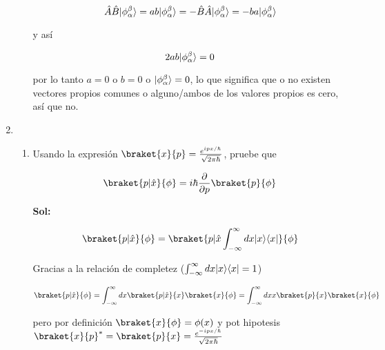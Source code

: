\documentclass[12pt,a4paper]{article}
\DeclarePairedDelimiter\bra{\langle}{\rvert}
\DeclarePairedDelimiter\ket{\lvert}{\rangle}
\begin{document}
\begin{enumerate}
\begin{enumerate}
    \begin{equation*}
        \hat{A}\hat{B} \ket{\phi_{\alpha}^{\beta}} = ab \ket{\phi_{\alpha}^{\beta}} = - \hat{B} \hat{A} \ket{\phi_{\alpha}^{\beta}} = -ba \ket{\phi_{\alpha}^{\beta}}
    \end{equation*}
    
    y así
    
    \begin{equation*}
        2 a b \ket{\phi_{\alpha}^{\beta}} = 0
    \end{equation*}
    
    por lo tanto $a = 0$ o $b =0$ o $\ket{\phi_{\alpha}^{\beta}} = 0$, lo que significa que o no existen vectores propios comunes o  alguno/ambos de los valores propios es cero, así que no.
    
    
    
    
\end{enumerate}






\item \begin{enumerate}
    \item Usando la expresión $\braket{x}{p} = \frac{e^{ipx/\hbar}}{\sqrt{2 \pi \hbar}}$, pruebe que
    
    \begin{equation*}
        \braket{p |\hat{x}}{\phi} = i \hbar \frac{\partial}{\partial p} \braket{p}{\phi}
    \end{equation*}
    
    \textbf{Sol:}
    
    \begin{equation*}
        \braket{p|\hat{x}}{\phi} = \braket{p | \hat{x}\int_{-\infty}^{\infty} dx\ket{x}\bra{x} }{\phi}
    \end{equation*}
    
    Gracias a la relación de completez ($\int_{-\infty}^{\infty} dx \ket{x}\bra{x} = 1$)
    
    \begin{equation*}
        \braket{p|\hat{x}}{\phi} = \int_{-\infty}^{\infty} dx \braket{p|\hat{x}}{x} \braket{x}{\phi} = \int_{-\infty}^{\infty} dx x \braket{p}{x} \braket{x}{\phi}
    \end{equation*}
    
    pero por definición $\braket{x}{\phi} = \phi (x)$ y pot hipotesis $\braket{x}{p}^{*}= \braket{p}{x} = \frac{e^{-ipx/\hbar}}{\sqrt{2\pi \hbar}}$
    

\end{enumerate}
\end{enumerate}
\end{document}
